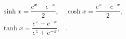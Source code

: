 \documentclass{article}
\begin{document}
\[
\begin{array}{ll}
\sinh x=\dfrac{e^x-e^{-x}}{2},& \cosh x=\dfrac{e^x+e^{-x}}{2},\\
\tanh x=\dfrac{e^x-e^{-x}}{e^x+e^{-x}},&.
\end{array}\]
\end{document}
